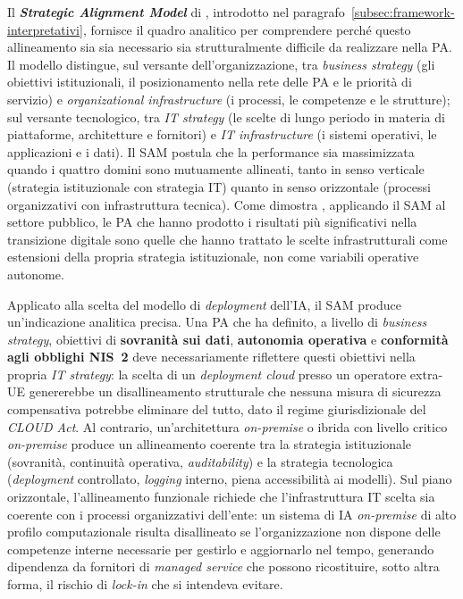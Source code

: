 Il \textbf{\textit{Strategic Alignment Model}} di \textcite{HendersonVenkatraman1993}, introdotto nel paragrafo~\ref{subsec:framework-interpretativi}, fornisce il quadro analitico per comprendere perché questo allineamento sia sia necessario sia strutturalmente difficile da realizzare nella PA. Il modello distingue, sul versante dell'organizzazione, tra \textit{business strategy} (gli obiettivi istituzionali, il posizionamento nella rete delle PA e le priorità di servizio) e \textit{organizational infrastructure} (i processi, le competenze e le strutture); sul versante tecnologico, tra \textit{IT strategy} (le scelte di lungo periodo in materia di piattaforme, architetture e fornitori) e \textit{IT infrastructure} (i sistemi operativi, le applicazioni e i dati). Il SAM postula che la performance sia massimizzata quando i quattro domini sono mutuamente allineati, tanto in senso verticale (strategia istituzionale con strategia IT) quanto in senso orizzontale (processi organizzativi con infrastruttura tecnica). Come dimostra \textcite{CordeiroSAM2019}, applicando il SAM al settore pubblico, le PA che hanno prodotto i risultati più significativi nella transizione digitale sono quelle che hanno trattato le scelte infrastrutturali come estensioni della propria strategia istituzionale, non come variabili operative autonome.

Applicato alla scelta del modello di \textit{deployment} dell'IA, il SAM produce un'indicazione analitica precisa. Una PA che ha definito, a livello di \textit{business strategy}, obiettivi di \textbf{sovranità sui dati}, \textbf{autonomia operativa} e \textbf{conformità agli obblighi NIS~2} deve necessariamente riflettere questi obiettivi nella propria \textit{IT strategy}: la scelta di un \textit{deployment cloud} presso un operatore extra-UE genererebbe un disallineamento strutturale che nessuna misura di sicurezza compensativa potrebbe eliminare del tutto, dato il regime giurisdizionale del \textit{CLOUD Act}. Al contrario, un'architettura \textit{on-premise} o ibrida con livello critico \textit{on-premise} produce un allineamento coerente tra la strategia istituzionale (sovranità, continuità operativa, \textit{auditability}) e la strategia tecnologica (\textit{deployment} controllato, \textit{logging} interno, piena accessibilità ai modelli). Sul piano orizzontale, l'allineamento funzionale richiede che l'infrastruttura IT scelta sia coerente con i processi organizzativi dell'ente: un sistema di IA \textit{on-premise} di alto profilo computazionale risulta disallineato se l'organizzazione non dispone delle competenze interne necessarie per gestirlo e aggiornarlo nel tempo, generando dipendenza da fornitori di \textit{managed service} che possono ricostituire, sotto altra forma, il rischio di \textit{lock-in} che si intendeva evitare.

